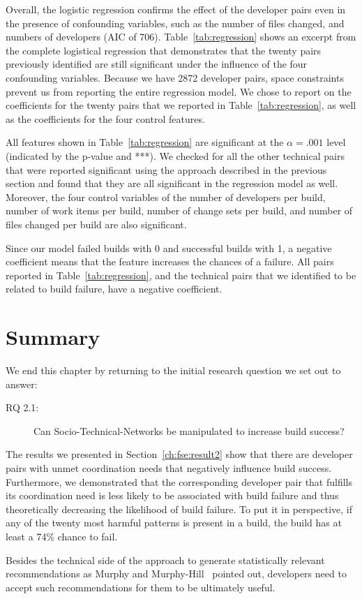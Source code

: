 Overall, the logistic regression confirms the effect of the developer pairs
even in the presence of confounding variables, such as the number of files changed,
and numbers of developers (AIC of 706). 
Table~\ref{tab:regression} shows an excerpt from the complete logistical
regression that demonstrates that the twenty pairs previously identified are still
significant under the influence of the four confounding variables. Because we have 2872 developer pairs, space constraints prevent us from reporting the entire regression model. We chose to report on the coefficients for the twenty pairs that we reported in Table~\ref{tab:regression}, as well as the coefficients for the four control features.

All features shown in Table~\ref{tab:regression} are significant at the $\alpha=.001$ level (indicated by the p-value and ***).
We checked for all the other technical pairs that were reported significant using the approach described in the previous section and found that they are all significant in the regression model as well.
Moreover, the four control variables of the number of developers per build, number
of work items per build, number of change sets per build, and number of files changed per build are also significant.

Since our model failed builds with 0 and successful builds with 1, a negative coefficient means that the feature increases the chances of a failure.
All pairs reported in Table~\ref{tab:regression}, and the technical pairs that we identified to be related to build failure, have a negative coefficient.
 

\vspace{-5pt}
\section{Summary}
\label{sec:8:conclusions}
\vspace{-5pt}
We end this chapter by returning to the initial research question we set out to answer:
\begin{description}
  \item[RQ 2.1:] Can Socio-Technical-Networks be manipulated to increase build success? 
\end{description}

The results we presented in Section~\ref{ch:fse:result2} show that there are developer pairs with unmet coordination needs that negatively influence build success.
Furthermore, we demonstrated that the corresponding developer pair that fulfills its coordination need is less likely to be associated with build failure and thus theoretically decreasing the likelihood of build failure.
To put it in perspective, if any of the twenty most harmful patterns is present in a build, the build has at least  a 74\% chance to fail.

Besides the technical side of the approach to generate statistically relevant recommendations as Murphy and Murphy-Hill~\cite{murphy:rsse:2010} pointed out, developers need to accept such recommendations for them to be ultimately useful.